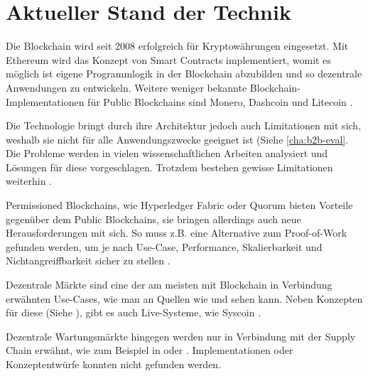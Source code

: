 \chapter{Aktueller Stand der Technik}
\label{cha:stand-technik}

Die Blockchain wird seit 2008 erfolgreich für Kryptowährungen eingesetzt. Mit Ethereum wird das Konzept von Smart Contracts implementiert, womit es möglich ist eigene Programmlogik in der Blockchain abzubilden und so dezentrale Anwendungen zu entwickeln. Weitere weniger bekannte Blockchain-Implementationen für Public Blockchains sind Monero, Dashcoin und Litecoin \cite{BlockchainHubBlockchainsDistributedLedger}. 

Die Technologie bringt durch ihre Architektur jedoch auch Limitationen mit sich, weshalb sie nicht für alle Anwendungszwecke geeignet ist (Siehe \ref{cha:b2b-eval}. Die Probleme werden in vielen wissenschaftlichen Arbeiten analysiert und Lösungen für diese vorgeschlagen. Trotzdem bestehen gewisse Limitationen weiterhin \cite{ZhengBlockchainChallengesOpportunities2017}\cite{SwanBlockchainblueprintnew2015}\cite{SchererPerformanceScalabilityBlockchain2017}.

Permissioned Blockchains, wie Hyperledger Fabric oder Quorum bieten Vorteile gegenüber dem Public Blockchains, sie bringen allerdings auch neue Herausforderungen mit sich. So muss z.B. eine Alternative zum Proof-of-Work gefunden werden, um je nach Use-Case, Performance, Skalierbarkeit und Nichtangreiffbarkeit sicher zu stellen \cite{LiScalablePrivateIndustrial2017}.

Dezentrale Märkte sind eine der am meisten mit Blockchain in Verbindung erwähnten Use-Cases, wie man an Quellen wie \cite{BenHamidaBlockchainEnterpriseOverview2017} und \cite{RavalDecentralizedApplicationsHarnessing2016} sehen kann.
Neben Konzepten für diese (Siehe \cite{KaiserDecentralizedPrivateMarketplace}), gibt es auch Live-Systeme, wie Syscoin \cite{SidhuSyscoinPeertoPeerElectronic2017}.

Dezentrale Wartungsmärkte hingegen werden nur in Verbindung mit der Supply Chain erwähnt, wie zum Beispiel in \cite{SoldatosWhatDoesBlockchain} oder \cite{GotzeLufthansaIndustrySolutions}. Implementationen oder Konzeptentwürfe konnten nicht gefunden werden.




